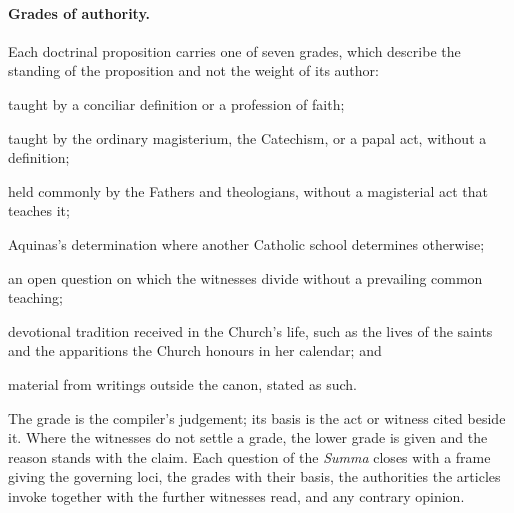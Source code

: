 \paragraph{Grades of authority.} Each doctrinal proposition carries one of
seven grades, which describe the standing of the proposition and not the
weight of its author:
\begin{description}[leftmargin=1.6em, style=nextline, itemsep=0.2em]
\item[Defined] taught by a conciliar definition or a profession of faith;
\item[Church teaching] taught by the ordinary magisterium, the Catechism, or a
papal act, without a definition;
\item[Common teaching] held commonly by the Fathers and theologians, without a
magisterial act that teaches it;
\item[Thomist position] Aquinas's determination where another Catholic school
determines otherwise;
\item[Disputed] an open question on which the witnesses divide without a
prevailing common teaching;
\item[Pious tradition] devotional tradition received in the Church's life,
such as the lives of the saints and the apparitions the Church honours in
her calendar; and
\item[Apocryphal] material from writings outside the canon, stated as such.
\end{description}
The grade is the compiler's judgement; its basis is the act or witness cited
beside it. Where the witnesses do not settle a grade, the lower grade is given
and the reason stands with the claim. Each question of the \emph{Summa} closes
with a frame giving the governing loci, the grades with their basis, the
authorities the articles invoke together with the further witnesses read, and
any contrary opinion.

